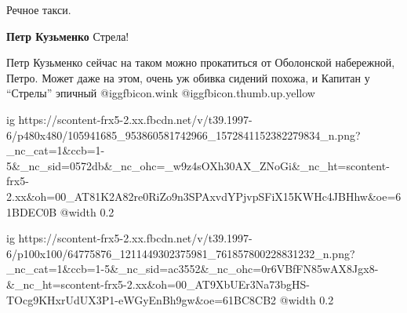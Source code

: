  
 
 
 
 

Речное такси.

\textbf{Петр Кузьменко} Стрела!


Петр Кузьменко сейчас на таком можно прокатиться от Оболонской набережной,
Петро. Может даже на этом, очень уж обивка сидений похожа, и Капитан у \enquote{Стрелы}
эпичный  @igg{fbicon.wink}  @igg{fbicon.thumb.up.yellow} 


\ifcmt
  ig https://scontent-frx5-2.xx.fbcdn.net/v/t39.1997-6/p480x480/105941685_953860581742966_1572841152382279834_n.png?_nc_cat=1&ccb=1-5&_nc_sid=0572db&_nc_ohc=_w9z4sOXh30AX_ZNoGi&_nc_ht=scontent-frx5-2.xx&oh=00_AT81K2A82re0RiZo9n3SPAxvdYPjvpSFiX15KWHc4JBHhw&oe=61BDEC0B
  @width 0.2
\fi


\ifcmt
  ig https://scontent-frx5-2.xx.fbcdn.net/v/t39.1997-6/p100x100/64775876_1211449302375981_761857800228831232_n.png?_nc_cat=1&ccb=1-5&_nc_sid=ac3552&_nc_ohc=0r6VBfFN85wAX8Jgx8-&_nc_ht=scontent-frx5-2.xx&oh=00_AT9XbUEr3Na73bgHS-TOcg9KHxrUdUX3P1-eWGyEnBh9gw&oe=61BC8CB2
  @width 0.2
\fi
